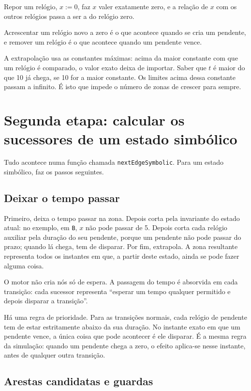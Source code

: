 \documentclass[11pt,a4paper]{article}
\newcommand{\code}[1]{\texttt{#1}}
\begin{document}
Repor um relógio, \(x := 0\), faz \(x\) valer exatamente zero, e a relação de \(x\) com os outros relógios passa a ser a do relógio zero.

Acrescentar um relógio novo a zero é o que acontece quando se cria um pendente, e remover um relógio é o que acontece quando um pendente vence.

A extrapolação usa as constantes máximas: acima da maior constante com que um relógio é comparado, o valor exato deixa de importar. Saber que \(t\) é maior do que 10 já chega, se 10 for a maior constante. Os limites acima dessa constante passam a infinito. É isto que impede o número de zonas de crescer para sempre.

\section{Segunda etapa: calcular os sucessores de um estado simbólico}

Tudo acontece numa função chamada \code{nextEdgeSymbolic}. Para um estado simbólico, faz os passos seguintes.

\subsection{Deixar o tempo passar}

Primeiro, deixa o tempo passar na zona. Depois corta pela invariante do estado atual: no exemplo, em \code{B}, \(x\) não pode passar de 5. Depois corta cada relógio auxiliar pela duração do seu pendente, porque um pendente não pode passar do prazo; quando lá chega, tem de disparar. Por fim, extrapola. A zona resultante representa todos os instantes em que, a partir deste estado, ainda se pode fazer alguma coisa.

O motor não cria nós só de espera. A passagem do tempo é absorvida em cada transição: cada sucessor representa ``esperar um tempo qualquer permitido e depois disparar a transição''.

Há uma regra de prioridade. Para as transições normais, cada relógio de pendente tem de estar estritamente abaixo da sua duração. No instante exato em que um pendente vence, a única coisa que pode acontecer é ele disparar. É a mesma regra da simulação: quando um pendente chega a zero, o efeito aplica-se nesse instante, antes de qualquer outra transição.

\subsection{Arestas candidatas e guardas}
\end{document}
